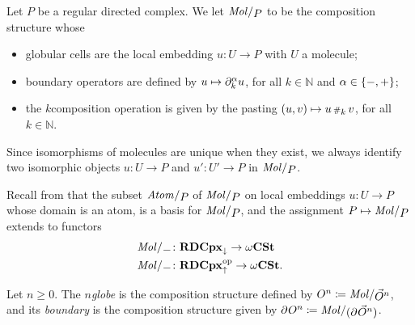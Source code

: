 \begin{dfn} 
    Let \( P \) be a regular directed complex.
    We let \( \molecin{P} \) to be the composition structure whose
    \begin{itemize}
        \item globular cells are the local embedding \( u \colon U \to P \) with \( U \) a molecule;
        \item boundary operators are defined by \( u \mapsto \partial_{k}^{ \alpha} u \), for all \( k \in \mathbb{N} \) and \( \alpha \in \left\{ {-, +} \right\} \);
        \item the \( k \)\nbd composition operation is given by the pasting \( (u, v) \mapsto u \,{\scriptstyle\#}_{k}\, v \), for all \( k \in \mathbb{N} \). 
    \end{itemize}    
\end{dfn}

\begin{rmk}
    Since isomorphisms of molecules are unique when they exist, we always identify two isomorphic objects \( u \colon U \to P \) and \( u' \colon U' \to P \) in \( \molecin{P} \).
\end{rmk}

\noindent Recall from \cite[Proposition 5.2.7, Theorem 6.2.35, Theorem 6.3.17]{hadzihasanovic2024combinatorics} that the subset \( \atomin{P} \) of \( \molecin{P} \) on local embeddings \( u \colon U \to P \) whose domain is an atom, is a basis for \( \molecin{P} \), and the assignment \( P \mapsto \molecin{P} \) extends to functors
\begin{align*}
    \molecin{-} &\colon \rdcpxmap \to \Comp \\
    \molecin{-} &\colon \opp{\rdcpxcomap} \to \Comp.   
\end{align*} 

\begin{dfn} [Globe]
    Let \( n \geq 0 \).
    The \emph{\( n \)\nbd globe} is the composition structure defined by \( \globe{n} \eqdef \molecin{\dglobe{n}} \), and its \emph{boundary} is the composition structure given by \( \bd{}{}\globe{n} \eqdef \molecin{(\bd{}{}\dglobe{n})} \).
\end{dfn}

